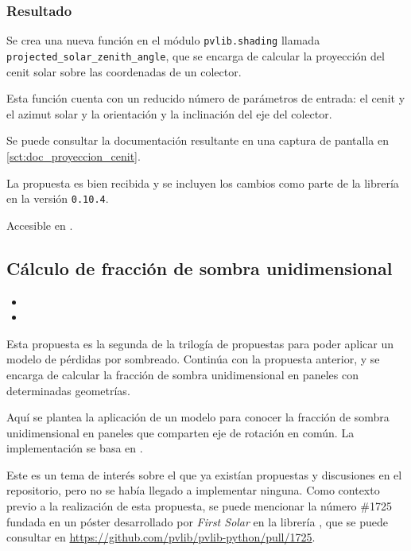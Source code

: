 \subsubsection{Resultado}

Se crea una nueva función en el \gls{módulo} \texttt{pvlib.shading} llamada \texttt{projected\_solar\_zenith\_angle}, que se encarga de calcular la proyección del cenit solar sobre las coordenadas de un colector.

Esta función cuenta con un reducido número de parámetros de entrada: el cenit y el azimut solar y la orientación y la inclinación del eje del colector.

Se puede consultar la documentación resultante en una captura de pantalla en \ref{sct:doc_proyeccion_cenit}.

La propuesta es bien recibida y se incluyen los cambios como parte de la librería en la versión \texttt{0.10.4}.

Accesible en .

\subsection{Cálculo de fracción de \gls{sombra} unidimensional} \label{sct:desarrollo:contribuciones_cientificas:fraccion_sombra}

\begin{itemize}
    \item {}
    \item {}
\end{itemize}

Esta propuesta es la segunda de la trilogía de propuestas para poder aplicar un modelo de pérdidas por sombreado. Continúa con la propuesta anterior, y se encarga de calcular la fracción de \gls{sombra} unidimensional en paneles con determinadas geometrías.

Aquí se plantea la aplicación de un modelo para conocer la fracción de \gls{sombra} unidimensional en paneles que comparten eje de rotación en común. La implementación se basa en \cite{Anderson_Jensen_2024}.

Este es un tema de interés sobre el que ya existían propuestas y discusiones en el repositorio, pero no se había llegado a implementar ninguna. Como contexto previo a la realización de esta propuesta, se puede mencionar la número \#1725 fundada en un póster desarrollado por \textit{First Solar} en la librería \pvlibpy, que se puede consultar en \url{https://github.com/pvlib/pvlib-python/pull/1725}.

